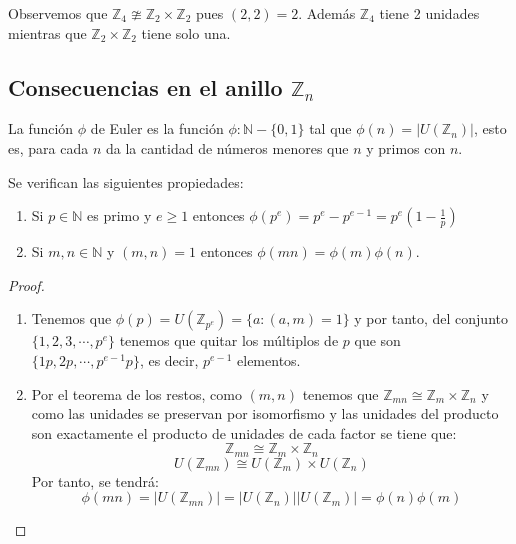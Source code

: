 \begin{example}
Observemos que $\mathbb{Z}_4 \ncong \mathbb{Z}_2 \times \mathbb{Z}_2$ pues $(2,2) = 2$. Además $\mathbb{Z}_4$ tiene 2 unidades mientras que $\mathbb{Z}_2 \times \mathbb{Z}_2$ tiene solo una. 
\end{example}

\subsection{Consecuencias en el anillo $\mathbb{Z}_n$}

\begin{definition}
La función $\phi$ de Euler es la función $\phi:\mathbb{N}-\{0,1\}$ tal que $\phi(n) = |U(\mathbb{Z}_n)|$, esto es, para cada $n$ da la cantidad de números menores que $n$ y primos con $n$. 
\end{definition}

\begin{proposition}
	Se verifican las siguientes propiedades:
\begin{enumerate}
	\item Si $p \in \mathbb{N}$ es primo y $e \ge 1$ entonces $\phi(p^e) = p^{e} - p^{e-1} = p^{e}(1- \frac{1}{p})$
	\item Si $m,n \in \mathbb{N}$ y $(m,n) = 1$ entonces $\phi(mn) = \phi(m)\phi(n)$.
\end{enumerate}
\end{proposition}
\begin{proof}
\begin{enumerate}
	\item Tenemos que $\phi(p) = U(\mathbb{Z}_{p^e}) = \{a:(a,m) = 1\}$ y por tanto, del conjunto $\{1,2,3,\cdots,p^e\}$ tenemos que quitar los múltiplos de $p$ que son $\{1p,2p,\cdots,p^{e-1}p\}$, es decir, $p^{e-1}$ elementos.
	\item Por el teorema de los restos, como $(m,n)$ tenemos que $\mathbb{Z}_{mn} \cong \mathbb{Z}_m \times \mathbb{Z}_n$ y como las unidades se preservan por isomorfismo y las unidades del producto son exactamente el producto de unidades de cada factor se tiene que: $$\mathbb{Z}_{mn} \cong \mathbb{Z}_m \times \mathbb{Z}_n$$ $$U(\mathbb{Z}_{mn}) \cong U(\mathbb{Z}_m) \times U(\mathbb{Z}_n)$$ Por tanto, se tendrá: $$\phi(mn) = |U(\mathbb{Z}_{mn})| = |U(\mathbb{Z}_n)||U(\mathbb{Z}_m)| = \phi(n)\phi(m)$$ 
\end{enumerate}

\end{proof}

